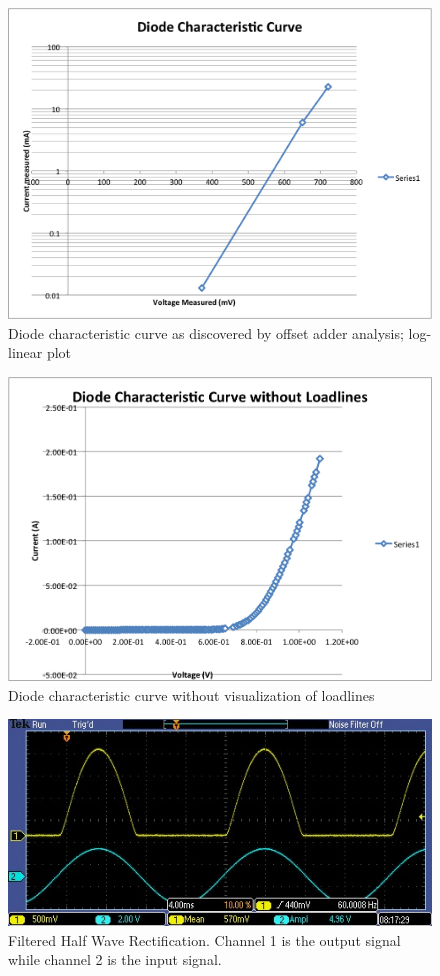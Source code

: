 \documentclass{article}
\begin{document}
    \begin{figure}[H]
        \centering
        \includegraphics[scale = 0.6]{3_4b.png}
        \caption{Diode characteristic curve as discovered by offset adder analysis; log-linear plot}
        \label{fig:my_label}
    \end{figure}
    \begin{figure}[H]
        \centering
        \includegraphics[scale = 0.6]{3_7.png}
        \caption{Diode characteristic curve without visualization of loadlines}
        \label{fig:my_label}
    \end{figure}
    \begin{figure}[H]
        \centering
        \includegraphics[scale = 0.65]{3_10.png}
        \caption{Filtered Half Wave Rectification. Channel 1 is the output signal while channel 2 is the input signal.}
        \label{fig:my_label}
    \end{figure}
\end{document}
